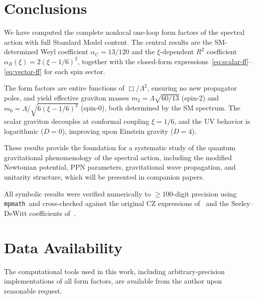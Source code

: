 \documentclass[aps,prd,twocolumn,superscriptaddress,nofootinbib,floatfix]{revtex4-2}
\begin{document}
\section{Conclusions}
\label{sec:conclusions}

We have computed the complete nonlocal one-loop form factors of the spectral
action with full Standard Model content. The central results are the
SM-determined Weyl coefficient $\alpha_C = 13/120$ and the
$\xi$-dependent $R^2$ coefficient $\alpha_R(\xi) = 2(\xi - 1/6)^2$, together
with the closed-form expressions~\eqref{eq:scalar-ff}--\eqref{eq:vector-ff}
for each spin sector.

The form factors are entire functions of $\Box/\Lambda^2$, ensuring no new
propagator poles, and yield effective graviton masses
$m_2 = \Lambda\sqrt{60/13}$ (spin-2) and $m_0 = \Lambda/\sqrt{6(\xi-1/6)^2}$
(spin-0), both determined by the SM spectrum. The scalar graviton decouples at
conformal coupling $\xi = 1/6$, and the UV behavior is logarithmic ($D = 0$),
improving upon Einstein gravity ($D = 4$).

These results provide the foundation for a systematic study of the quantum
gravitational phenomenology of the spectral action, including the modified
Newtonian potential, PPN parameters, gravitational wave propagation, and
unitarity structure, which will be presented in companion papers.


\begin{acknowledgments}
All symbolic results were verified numerically to $\geq 100$-digit precision
using \texttt{mpmath}~and cross-checked against the original CZ expressions
of~\cite{Codello:2012kq} and the Seeley--DeWitt coefficients
of~\cite{Vassilevich:2003xt,Avramidi:2000bm}.
\end{acknowledgments}

\section*{Data Availability}
The computational tools used in this work, including arbitrary-precision
implementations of all form factors, are available from the author upon
reasonable request.


\end{document}
